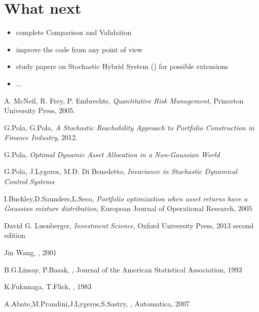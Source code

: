 \documentclass[]{article}
\begin{document}
\section{What next}
\begin{itemize}
	\item complete Comparison and Validation
	\item improve the code from any point of view
	\item study papers on Stochastic Hybrid System (\cite{SHS}) for possible extensions
	\item $ \dots$
\end{itemize}
\begin{thebibliography}{9}
	
	A. McNeil, R. Frey, P. Embrechts,
	\textit{Quantitative Risk Management},
	Princeton University Press,
	2005.
	
	G.Pola, G.Pola,
	\textit{A Stochastic Reachability Approach to Portfolio Construction in Finance Industry},
	2012.
	
	G.Pola,
	\textit{Optimal Dynamic Asset Allocation in a Non-Gaussian World}
	
	
	G.Pola, J.Lygeros, M.D. Di Benedetto,
	\textit{Invariance in Stochastic Dynamical Control Systems}
	
	I.Buckley,D.Saunders,L.Seco,
	\textit{Portfolio optimization when asset returns have a Gaussian mixture distribution},
	European Journal of Operational Research,
	2005
	
	David G. Luenberger,
	\textit{Investment Science},
	Oxford University Press,
	2013 second edition
	
	Jin Wang,
	,
	2001
	
	B.G.Linsay, P.Basak,
	,
	Journal of the American Statistical Association,
	1993
	
	K.Fukunaga, T.Flick,
	,
	1983
	
	A.Abate,M.Prandini,J.Lygeros,S.Sastry,
	,
	Automatica,
	2007
\end{thebibliography}
\end{document}
